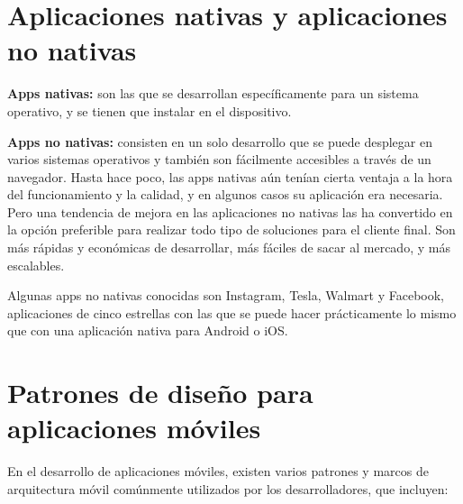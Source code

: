\documentclass{article}
\begin{document}
	\section*{Aplicaciones nativas y aplicaciones no nativas}
	
	\textbf{Apps nativas:} son las que se desarrollan específicamente para un sistema operativo, y se tienen que instalar en el dispositivo.
	
	\textbf{Apps no nativas:} consisten en un solo desarrollo que se puede desplegar en varios sistemas operativos y también son fácilmente accesibles a través de un navegador. Hasta hace poco, las apps nativas aún tenían cierta ventaja a la hora del funcionamiento y la calidad, y en algunos casos su aplicación era necesaria. Pero una tendencia de mejora en las aplicaciones no nativas las ha convertido en la opción preferible para realizar todo tipo de soluciones para el cliente final. Son más rápidas y económicas de desarrollar, más fáciles de sacar al mercado, y más escalables.
	
	Algunas apps no nativas conocidas son Instagram, Tesla, Walmart y Facebook, aplicaciones de cinco estrellas con las que se puede hacer prácticamente lo mismo que con una aplicación nativa para Android o iOS.
	
	\section*{Patrones de diseño para aplicaciones móviles}
	
	En el desarrollo de aplicaciones móviles, existen varios patrones y marcos de arquitectura móvil comúnmente utilizados por los desarrolladores, que incluyen:
	
\end{document}
